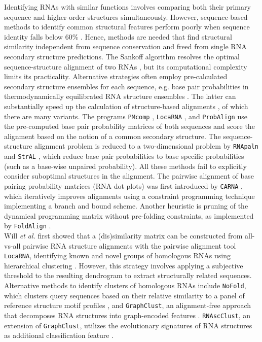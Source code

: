 \documentclass{bmcart}
\newcommand\graphclust{\texttt{GraphClust}}
\newcommand\locarna{\texttt{LocaRNA}}
\newcommand\carna{\texttt{CARNA}}
\begin{document}
Identifying RNAs with similar functions involves comparing both their primary
sequence and higher-order structures simultaneously. However, sequence-based 
methods to identify common structural features perform poorly when sequence 
identity falls below 60\%  \cite{Gardner15860779}. Hence, methods are needed
that find structural similarity independent from sequence conservation and
freed from single RNA secondary structure predictions. The Sankoff algorithm
resolves the optimal sequence-structure alignment of two RNAs \cite{sankoff85},
but its computational complexity limits its practicality. Alternative
strategies often employ pre-calculated secondary structure ensembles for each
sequence, e.g. base pair probabilities in thermodynamically equilibrated RNA
structure ensembles \cite{McCaskill:1990}. The latter can substantially speed
up the calculation of structure-based alignments \cite{Hofacker15073017}, of
which there are many variants.  The programs \texttt{PMcomp} \cite{Hofacker15073017},
\locarna{} \cite{Will17432929}, and \texttt{ProbAlign} \cite{Roshan16954142} use the pre-computed
base pair probability matrices of both sequences and score the alignment based
on the notion of a common secondary structure. The sequence-structure alignment
problem is reduced to a two-dimensional problem by \texttt{RNApaln} \cite{Lorenz22115189} and
\texttt{StrAL} \cite{Dalli16613908}, which reduce base pair probabilities to base
specific probabilities (such as a base-wise unpaired probability). All these methods fail 
to explicitly consider suboptimal structures in the alignment. The pairwise
alignment of base pairing probability matrices (RNA dot plots) was first introduced 
by \carna{} \cite{Palu2010,Sorescu2012}, which iteratively improves alignments using a constraint programming technique implementing a branch and bound scheme. 
Another heuristic is pruning of the dynamical programming matrix without pre-folding constraints, as implemented by \texttt{FoldAlign} \cite{Havgaard17937495,Sundfeld26704597}. \\ 

Will \textit{et al.} \nocite{Will17432929} first showed that a (dis)similarity matrix can be constructed from all-vs-all pairwise RNA structure alignments with the pairwise alignment tool \locarna{}, identifying known and novel groups of homologous RNAs using hierarchical clustering \cite{Will17432929}. However, this strategy involves applying a subjective threshold to the resulting dendrogram to extract structurally related sequences. Alternative methods to identify clusters of homologous RNAs include \texttt{NoFold}, which clusters query sequences based on their relative similarity to a panel of reference structure motif profiles \cite{Middleton25234928}, and \graphclust{}, an alignment-free approach that decomposes RNA structures into graph-encoded features \cite{Heyne22689765}. \texttt{RNAscClust}, an extension of \graphclust{}, utilizes the evolutionary signatures of RNA structures as additional classification feature \cite{Miladi28334186}. \\
\end{document}
